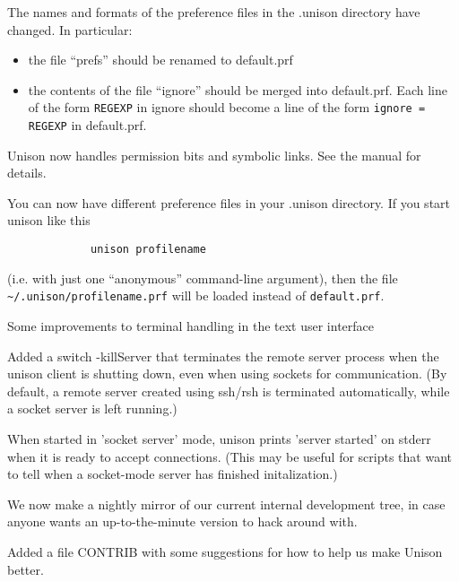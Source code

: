\begin{changesfromversion}{1.111}
\item \incompatible{} The names and formats of the preference files in
the .unison directory have changed.  In particular:
\begin{itemize}
\item the file ``prefs'' should be renamed to default.prf
\item the contents of the file ``ignore'' should be merged into
  default.prf.  Each line of the form \verb|REGEXP| in ignore should
  become a line of the form \verb|ignore = REGEXP| in default.prf.
\end{itemize}
\item Unison now handles permission bits and  symbolic links.  See the
manual for details.

\item You can now have different preference files in your .unison
directory.  If you start unison like this
\begin{verbatim}
             unison profilename
\end{verbatim}
(i.e. with just one ``anonymous'' command-line argument), then the
file \verb|~/.unison/profilename.prf| will be loaded instead of
\verb|default.prf|.

\item Some improvements to terminal handling in the text user interface

\item Added a switch -killServer that terminates the remote server process
when the unison client is shutting down, even when using sockets for
communication.  (By default, a remote server created using ssh/rsh is
terminated automatically, while a socket server is left running.)
\item When started in 'socket server' mode, unison prints 'server started' on
  stderr when it is ready to accept connections.
  (This may be useful for scripts that want to tell when a socket-mode server
  has finished initalization.)
\item We now make a nightly mirror of our current internal development
  tree, in case anyone wants an up-to-the-minute version to hack
  around with.
\item Added a file CONTRIB with some suggestions for how to help us
make Unison better.
\end{changesfromversion}
